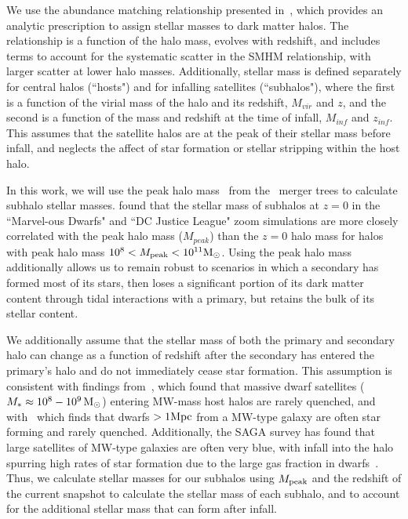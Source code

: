 \documentclass[twocolumn]{aastex631}
\begin{document}
    We use the abundance matching relationship presented in~\citet{Moster2013}, which provides an analytic prescription to assign stellar masses to dark matter halos. 
    The~\citet{Moster2013} relationship is a function of the halo mass, evolves with redshift, and includes terms to account for the systematic scatter in the SMHM relationship, with larger scatter at lower halo masses.
    Additionally, stellar mass is defined separately for central halos (``hosts") and for infalling satellites (``subhalos"), where the first is a function of the virial mass of the halo and its redshift, $M_{vir}$ and $z$, and the second is a function of the mass and redshift at the time of infall, $M_{inf}$ and $z_{inf}$. 
    This assumes that the satellite halos are at the peak of their stellar mass before infall, and neglects the affect of star formation or stellar stripping within the host halo. 

    In this work, we will use the peak halo mass \Mpeak\ from the \sublink\ merger trees to calculate subhalo stellar masses. 
    \citet{Munshi2021} found that the stellar mass of subhalos at $z=0$ in the ``Marvel-ous Dwarfs" and ``DC Justice League" zoom simulations are more closely correlated with the peak halo mass ($M_{peak}$) than the $z=0$ halo mass for halos with peak halo mass $10^8<M_{\rm peak}<10^{11} \mathrm{M}_\odot$. 
    Using the peak halo mass additionally allows us to remain robust to scenarios in which a secondary has formed most of its stars, then loses a significant portion of its dark matter content through tidal interactions with a primary, but retains the bulk of its stellar content.
        
    We additionally assume that the stellar mass of both the primary and secondary halo can change as a function of redshift after the secondary has entered the primary's halo and do not immediately cease star formation. 
    This assumption is consistent with findings from~\cite{Akins2021}, which found that massive dwarf satellites ($M_*\approx 10^8-10^9\, \mathrm{M}_\odot$) entering MW-mass host halos are rarely quenched, and with~\cite{geha13} which finds that dwarfs $>1\mathrm{Mpc}$ from a MW-type galaxy are often star forming and rarely quenched.
    Additionally, the SAGA survey has found that large satellites of MW-type galaxies are often very blue, with infall into the halo spurring high rates of star formation due to the large gas fraction in dwarfs~\citep{saga}. 
    Thus, we calculate stellar masses for our subhalos using $M_{\rm peak}$ and the redshift of the current snapshot to calculate the stellar mass of each subhalo, and to account for the additional stellar mass that can form after infall. 
\end{document}
